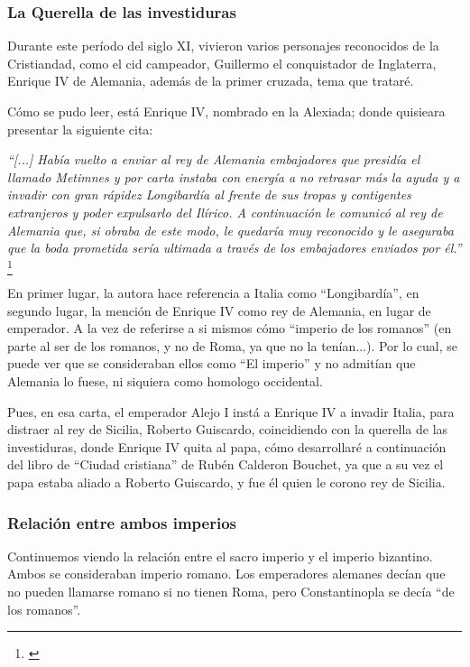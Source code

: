 

\subsubsection{La Querella de las investiduras}

Durante este período del siglo XI, vivieron varios personajes
reconocidos de la Cristiandad, como el cid campeador, Guillermo
el conquistador de Inglaterra, Enrique IV de Alemania, además
de la primer cruzada, tema que trataré.

Cómo se pudo leer, está Enrique IV, nombrado en la Alexiada;
donde quisieara presentar la siguiente cita:

\textit{``[...] Había vuelto a enviar al rey de Alemania embajadores
que presidía el llamado Metimnes y por carta instaba con energía a no
retrasar más la ayuda y a invadir con gran rápidez Longibardía al frente
de sus tropas y contigentes extranjeros y poder expulsarlo del Ilírico.
A continuación le comunicó al rey de Alemania que, si obraba de este
modo, le quedaría muy reconocido y le aseguraba que la boda prometida
sería ultimada a través de los embajadores enviados por él.''}
\footnote{\cite[p.~215]{alexiadaV}}

En primer lugar, la autora hace referencia a Italia como ``Longibardía'',
en segundo lugar, la mención de Enrique IV como rey de Alemania, en
lugar de emperador. A la vez de referirse a si mismos cómo
``imperio de los romanos'' (en parte al ser de los romanos, y no
de Roma, ya que no la tenían...). Por lo cual, se puede ver
que se consideraban ellos como ``El imperio'' y no admitían que
Alemania lo fuese, ni siquiera como homologo occidental.

Pues, en esa carta, el emperador Alejo I instá a Enrique IV a invadir
Italia, para distraer al rey de Sicilia, Roberto Guiscardo,
coincidiendo con la querella de las investiduras, donde Enrique IV
quita al papa, cómo desarrollaré a continuación del libro de
``Ciudad cristiana'' de Rubén Calderon Bouchet, ya que a su vez
el papa estaba aliado a Roberto Guiscardo, y fue él quien le corono
rey de Sicilia.

\subsubsection{Relación entre ambos imperios}

Continuemos viendo la relación entre el sacro imperio y
el imperio bizantino. Ambos se consideraban imperio romano.
Los emperadores alemanes decían que no pueden llamarse romano
si no tienen Roma, pero Constantinopla se decía ``de los
romanos''.

